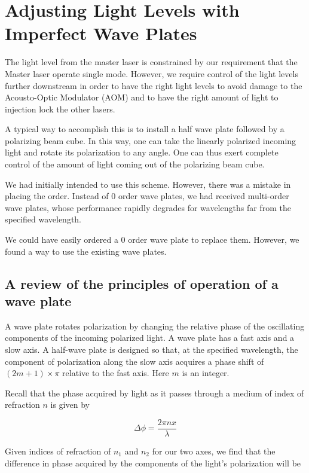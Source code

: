 \chapter{Adjusting Light Levels with Imperfect Wave Plates}
\label{twoWaveplateTrick}

The light level from the master laser is constrained by our requirement that the Master laser operate single mode. However, we require control of the light levels further downstream in order to have the right light levels to avoid damage to the Acousto-Optic Modulator (AOM) and to have the right amount of light to injection lock the other lasers. 

A typical way to accomplish this is to install a half wave plate followed by a polarizing beam cube. In this way, one can take the linearly polarized incoming light and rotate its polarization to any angle. One can thus exert complete control of the amount of light coming out of the polarizing beam cube. 

We had initially intended to use this scheme. However, there was a mistake in placing the order. Instead of 0 order wave plates, we had received multi-order wave plates, whose performance rapidly degrades for wavelengths far from the specified wavelength. 

We could have easily ordered a 0 order wave plate to replace them. However, we found a way to use the existing wave plates.

\section{A review of the principles of operation of a wave plate}

A wave plate rotates polarization by changing the relative phase of the oscillating components of the incoming polarized light. A wave plate has a fast axis and a slow axis. A half-wave plate is designed so that, at the specified wavelength, the component of polarization along the slow axis acquires a phase shift of $(2m+1)\times\pi$ relative to the fast axis. Here $m$ is an integer. 

Recall that the phase acquired by light as it passes through a medium of index of refraction $n$ is given by 

\begin{equation}
  \Delta \phi = \frac{2 \pi n x}{\lambda} \label{deltaPhi0}
\end{equation}

Given indices of refraction of $n_1$ and $n_2$ for our two axes, we find that the difference in phase acquired by the components of the light's polarization will be 

